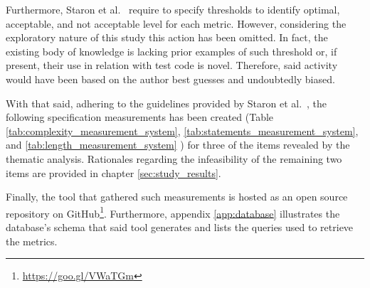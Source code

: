     Furthermore, Staron et al.\ \cite{metrics_paper} require to specify thresholds to identify optimal, acceptable, and not acceptable level for each metric. However, considering the exploratory nature of this study this action has been omitted. In fact, the existing body of knowledge is lacking prior examples of such threshold or, if present, their use in relation with test code is novel. Therefore, said activity would have been based on the author best guesses and undoubtedly biased.
    
    With that said, adhering to the guidelines provided by Staron et al.\ \cite{metrics_paper}, the following specification measurements has been created (Table \ref{tab:complexity_measurement_system}, \ref{tab:statements_measurement_system}, and \ref{tab:length_measurement_system} ) for three of the items revealed by the thematic analysis. Rationales regarding the infeasibility of the remaining two items are provided in chapter \ref{sec:study_results}.
    
    Finally, the tool that gathered such measurements is hosted as an open source repository on GitHub\footnote{\href{https://goo.gl/VWaTGm}{https://goo.gl/VWaTGm}}. Furthermore, appendix \ref{app:database} illustrates the database's schema that said tool generates and lists the queries used to retrieve the metrics.
    
